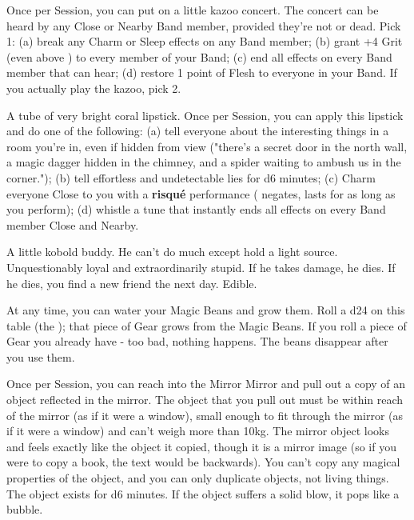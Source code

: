 \begin{multicols*}{2}
Once per Session, you can put on a little kazoo concert. The concert can be heard by any Close or Nearby Band member, provided they're not  or dead.  Pick 1:  (a) break any Charm or Sleep effects on any Band member; (b) grant +4 Grit (even above \MAX) to every member of your Band; (c) end all \Duration effects on every Band member that can hear; (d) restore 1 point of Flesh to everyone in your Band.  If you actually play the kazoo, pick 2.


A tube of very bright coral lipstick.  Once per Session, you can apply this lipstick and do one of the following:  (a) tell everyone about the interesting things in a room you're in, even if hidden from view ("there's a secret door in the north wall, a magic dagger hidden in the chimney, and a spider waiting to ambush us in the corner."); (b) tell effortless and undetectable lies for d6 minutes;  (c) Charm everyone Close to you with a {\selectfont \bfseries{risqué}} performance ( negates, lasts for as long as you perform); (d) whistle a tune that instantly ends all \Duration effects on every Band member Close and Nearby.



A little kobold buddy. He can't do much except hold a light source.  Unquestionably loyal and extraordinarily stupid.  If he takes damage, he dies. If he dies, you find a new friend the next day.  Edible.


At any time, you can water your Magic Beans and grow them.  Roll a d24 on this table (the ); that piece of Gear grows from the Magic Beans.  If you roll a piece of Gear you already have - too bad, nothing happens. The beans disappear after you use them.



Once per Session, you can reach into the Mirror Mirror and pull out a copy of an object reflected in the mirror.  The object that you pull out must be within reach of the mirror (as if it were a window), small enough to fit through the mirror (as if it were a window) and can’t weigh more than 10kg. The mirror object looks and feels exactly like the object it copied, though it is a mirror image (so if you were to copy a book, the text would be backwards). You can’t copy any magical properties of the object, and you can only duplicate objects, not living things. The object exists for d6 minutes. If the object suffers a solid blow, it pops like a bubble.



\end{multicols*}
